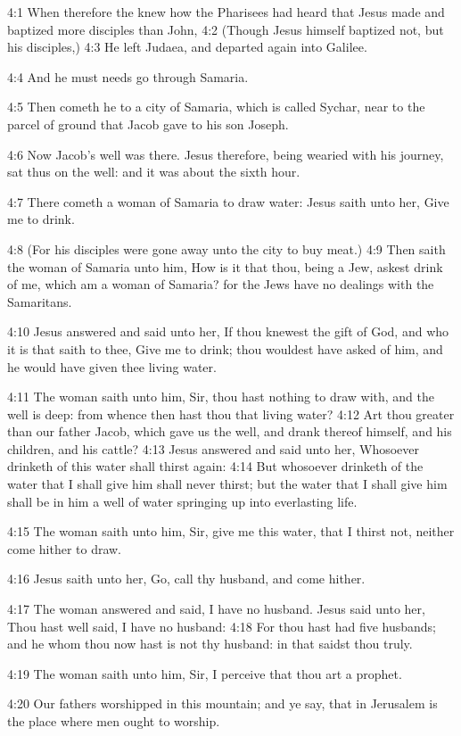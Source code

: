 4:1 When therefore the \LORD knew how the Pharisees had heard that
Jesus made and baptized more disciples than John, 4:2 (Though Jesus
himself baptized not, but his disciples,) 4:3 He left Judaea, and
departed again into Galilee.

4:4 And he must needs go through Samaria.

4:5 Then cometh he to a city of Samaria, which is called Sychar, near
to the parcel of ground that Jacob gave to his son Joseph.

4:6 Now Jacob's well was there. Jesus therefore, being wearied with
his journey, sat thus on the well: and it was about the sixth hour.

4:7 There cometh a woman of Samaria to draw water: Jesus saith unto
her, Give me to drink.

4:8 (For his disciples were gone away unto the city to buy meat.)  4:9
Then saith the woman of Samaria unto him, How is it that thou, being a
Jew, askest drink of me, which am a woman of Samaria? for the Jews
have no dealings with the Samaritans.

4:10 Jesus answered and said unto her, If thou knewest the gift of
God, and who it is that saith to thee, Give me to drink; thou wouldest
have asked of him, and he would have given thee living water.

4:11 The woman saith unto him, Sir, thou hast nothing to draw with,
and the well is deep: from whence then hast thou that living water?
4:12 Art thou greater than our father Jacob, which gave us the well,
and drank thereof himself, and his children, and his cattle?  4:13
Jesus answered and said unto her, Whosoever drinketh of this water
shall thirst again: 4:14 But whosoever drinketh of the water that I
shall give him shall never thirst; but the water that I shall give him
shall be in him a well of water springing up into everlasting life.

4:15 The woman saith unto him, Sir, give me this water, that I thirst
not, neither come hither to draw.

4:16 Jesus saith unto her, Go, call thy husband, and come hither.

4:17 The woman answered and said, I have no husband. Jesus said unto
her, Thou hast well said, I have no husband: 4:18 For thou hast had
five husbands; and he whom thou now hast is not thy husband: in that
saidst thou truly.

4:19 The woman saith unto him, Sir, I perceive that thou art a
prophet.

4:20 Our fathers worshipped in this mountain; and ye say, that in
Jerusalem is the place where men ought to worship.

